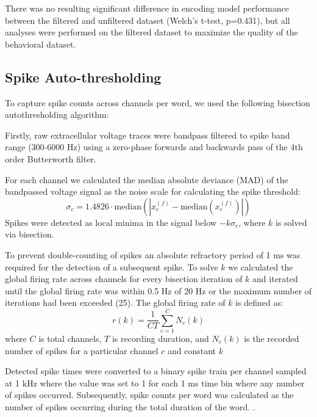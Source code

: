 \documentclass[pdflatex,sn-basic]{sn-jnl}%
\theoremstyle{thmstyleone}%
\theoremstyle{thmstyletwo}%
\theoremstyle{thmstylethree}%
\begin{document}
There was no resulting significant difference in encoding model performance between the filtered and unfiltered dataset (Welch's t-test, p=0.431), but all analyses were performed on the filtered dataset to maximize the quality of the behavioral dataset.

\subsection{Spike Auto-thresholding}\label{subsec7}
To capture spike counts across channels per word, we used the following bisection autothresholding algorithm:

Firstly, raw extracellular voltage traces were bandpass filtered to spike band range (300-6000 Hz) using a zero-phase forwards and backwards pass of the 4th order Butterworth filter. 

For each channel we calculated the median absolute deviance (MAD) of the bandpassed voltage signal as the noise scale for calculating the spike threshold:
\[
\sigma_{c}=1.4826\cdot \mathrm{median}(|x_{c}^{(f)}-\mathrm{median}(x_{c}^{(f)})|)
\]
Spikes were detected as local minima in the signal below $-k\sigma_{c}$, where $k$ is solved via bisection. 

To prevent double-counting of spikes an absolute refractory period of 1 ms was required for the detection of a subsequent spike. 
To solve $k$ we calculated the global firing rate across channels for every bisection iteration of $k$ and iterated until the global firing rate was within 0.5 Hz of 20 Hz or the maximum number of iterations had been exceeded (25). The global firing rate of $k$ is defined as:
\[
r(k)=\frac{1}{CT}\sum_{c=1}^{C}N_{c}(k)
\]
where $C$ is total channels, $T$ is recording duration, and $N_{c}(k)$  is the recorded number of spikes for a particular channel $c$ and constant $k$

Detected spike times were converted to a binary spike train per channel sampled at 1 kHz where the value was set to 1 for each 1 ms time bin where any number of spikes occurred. Subsequently, spike counts per word was calculated as the number of spikes occurring during the total duration of the word.
.
\end{document}
